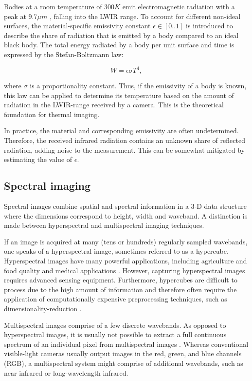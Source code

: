 \documentclass{l4proj}
\begin{document}
Bodies at a room temperature of $300 K$ emit electromagnetic radiation with a peak at $9.7 \mu m$ \citep{jarc_graz_2007}, falling into the LWIR range. To account for different non-ideal surfaces, the material-specific emissivity constant $\epsilon \in [0..1]$ is introduced to describe the share of radiation that is emitted by a body compared to an ideal black body. The total energy radiated by a body per unit surface and time is expressed by the Stefan-Boltzmann law:

\begin{equation}
  W = \epsilon \sigma T^4,
\end{equation}

where $\sigma$ is a proportionality constant. Thus, if the emissivity of a body is known, this law can be applied to determine its temperature based on the amount of radiation in the LWIR-range received by a camera. This is the theoretical foundation for thermal imaging. 

In practice, the material and corresponding emissivity are often undetermined. Therefore, the received infrared radiation contains an unknown share of reflected radiation, adding noise to the measurement. This can be somewhat mitigated by estimating the value of $\epsilon$.

\subsection{Spectral imaging}

Spectral images combine spatial and spectral information in a 3-D data structure where the dimensions correspond to height, width and waveband. 
A distinction is made between hyperspectral and multispectral imaging techniques. 

If an image is acquired at many (tens or hundreds) regularly sampled wavebands, one speaks of a hyperspectral image, sometimes referred to as a hypercube. Hyperspectral images have many powerful applications, including agriculture and food quality \citep{dale_hyperspectral_2013} and medical applications \citep{lu_medical_2014}. However, capturing hyperspectral images requires advanced sensing equipment. Furthermore, hypercubes are difficult to process due to the high amount of information and therefore often require the application of computationally expensive preprocessing techniques, such as dimensionality-reduction \citep{qin_hyperspectral_2013}.

Multispectral images comprise of a few discrete wavebands. As opposed to hyperspectral images, it is usually not possible to extract a full continuous spectrum of an individual pixel from multispectral images \citep{abdul_multi-disnet_2019}. Whereas conventional visible-light cameras usually output images in the red, green, and blue channels (RGB), a multispectral system might comprise of additional wavebands, such as near infrared or long-wavelength infrared.
\end{document}
